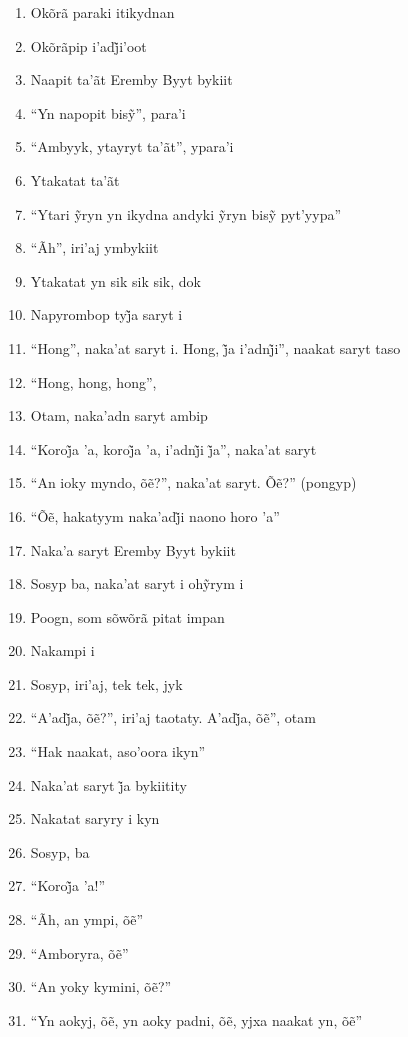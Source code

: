 \begin{enumerate}
 \item Okõrã paraki itikydnan
 \item Okõrãpip i’adj̃i’oot 
 \item Naapit ta'ãt Eremby Byyt bykiit
 \item ``Yn napopit bisỹ'', para’i
 \item ``Ambyyk, ytayryt ta'ãt'', ypara'i
 \item Ytakatat ta'ãt
 \item ``Ytari ỹryn yn ikydna andyki ỹryn bisỹ pyt’yypa''
 \item ``Ãh'', iri'aj ymbykiit
 \begin{center}\end{center}
 \item Ytakatat yn sik sik sik, dok
 \item Napyrombop tyj̃a saryt i
 \item ``Hong'', naka’at saryt i. Hong, j̃a i’adnj̃i'', naakat saryt taso
 \item ``Hong, hong, hong'',
 \item Otam, naka'adn saryt ambip
 \item ``Koroj̃a ’a, koroj̃a ’a, i’adnj̃i j̃a'', naka’at saryt
 \item ``An ioky myndo, õẽ?'', naka’at saryt. Õẽ?'' (pongyp)
 \item ``Õẽ, hakatyym naka’adj̃i naono horo ’a''
 \item Naka'a saryt Eremby Byyt bykiit
 \item Sosyp ba, naka’at saryt i ohỹrym i
 \item Poogn, som sõwõrã pitat impan
 \item Nakampi i
 \begin{center}\end{center}
 \item Sosyp, iri'aj, tek tek, jyk
 \item ``A’adj̃a, õẽ?'', iri’aj taotaty. A’adj̃a, õẽ'', otam
 \item ``Hak naakat, aso'oora ikyn''
 \item Naka’at saryt j̃a bykiitity
 \item Nakatat saryry i kyn
 \item Sosyp, ba
 \item ``Koroj̃a ’a!''
 \item ``Ãh, an ympi, õẽ''
 \item ``Amboryra, õẽ''
 \item ``An yoky kymini, õẽ?''
 \item ``Yn aokyj, õẽ, yn aoky padni, õẽ, yjxa naakat yn, õẽ''

\end{enumerate}
